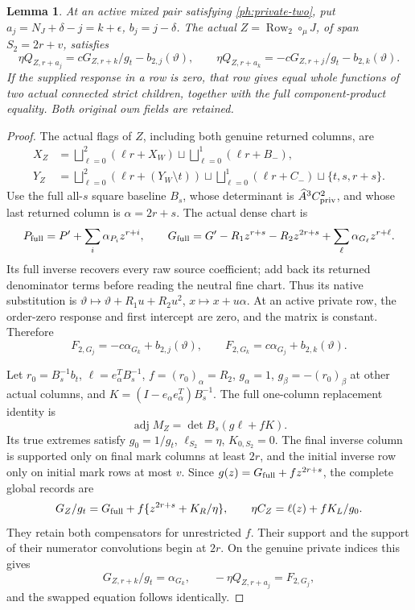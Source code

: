 \documentclass[11pt,a4paper]{amsart}
\numberwithin{equation}{section}
\theoremstyle{plain}
\newtheorem{lemma}[theorem]{Lemma}
\theoremstyle{definition}
\newcommand{\Row}{\operatorname{Row}}
\begin{document}
\begin{lemma}\label{ph:two-copy-equation}
At an active mixed pair satisfying \eqref{ph:private-two}, put
\(a_j=N_J+\delta-j=k+\epsilon\), \(b_j=j-\delta\).
The actual \(Z=\Row_2\circ_\mu J\), of span \(S_2=2r+v\), satisfies
\[
 \eta Q_{Z,r+a_j}
       =cG_{Z,r+k}/g_t-b_{2,j}(\vartheta),
 \qquad
 \eta Q_{Z,r+a_k}
       =-cG_{Z,r+j}/g_t-b_{2,k}(\vartheta).
\]
If the supplied response in a row is zero, that row gives equal whole
functions of two actual connected strict children, together with the
full component-product equality.  Both original own fields are retained.
\end{lemma}
\begin{proof}
The actual flags of \(Z\), including both genuine returned columns, are
\[
 \begin{aligned}
 X_Z&=\bigsqcup_{\ell=0}^{2}(\ell r+X_W)
                      \sqcup\bigsqcup_{\ell=0}^{1}(\ell r+B_-),\\
 Y_Z&=\bigsqcup_{\ell=0}^{2}(\ell r+(Y_W\setminus t))
             \sqcup\bigsqcup_{\ell=0}^{1}(\ell r+C_-)
                         \sqcup\{t,s,r+s\}.
 \end{aligned}
\]
Use the full all-\(s\) square baseline \(B_s\), whose determinant is
\(\widehat A^3C_{\rm priv}^2\), and whose last returned column is
\(\alpha=2r+s\).
The actual dense chart is
\[
 P_{\rm full}=P'+\sum_i\alpha_{P_i}z^{r+i},\qquad
 G_{\rm full}=G'-R_1z^{r+s}-R_2z^{2r+s}
                           +\sum_\ell\alpha_{G_\ell}z^{r+\ell}.
\]
Its full inverse recovers every raw source coefficient; add back its
returned denominator terms before reading the neutral fine chart.
Thus its native substitution is \(\vartheta\mapsto \vartheta+R_1u+R_2u^2\),
\(x\mapsto x+u\alpha\).
At an active private row, the order-zero response and first intercept
are zero, and the matrix is constant.  Therefore
\[
 F_{2,G_j}=-c\alpha_{G_k}+b_{2,j}(\vartheta),\qquad
 F_{2,G_k}=c\alpha_{G_j}+b_{2,k}(\vartheta).
\]

Let \(r_0=B_s^{-1}b_t\), \(\ell=e_\alpha^TB_s^{-1}\),
\(f=(r_0)_\alpha=R_2\),
\(g_\alpha=1\), \(g_\beta=-(r_0)_\beta\) at other actual columns,
and \(K=(I-e_\alpha e_\alpha^T)B_s^{-1}\).
The full one-column replacement identity is
\[
 \operatorname{adj}M_Z=\det B_s(g\ell+fK).
\]
Its true extremes satisfy \(g_0=1/g_t\), \(\ell_{S_2}=\eta\),
\(K_{0,S_2}=0\).
The final inverse column is supported only on final mark columns
at least \(2r\), and the initial inverse row only on initial mark
rows at most \(v\).  Since
\(g(z)=G_{\rm full}+fz^{2r+s}\), the complete global records are
\[
 G_Z/g_t=G_{\rm full}+f\{z^{2r+s}+K_R/\eta\},\qquad
 \eta C_Z=\ell(z)+fK_L/g_0.
\]
They retain both compensators for unrestricted \(f\).
Their support and the support of their numerator convolutions begin
at \(2r\).  On the genuine private indices this gives
\[
 G_{Z,r+k}/g_t=\alpha_{G_k},\qquad
 -\eta Q_{Z,r+a_j}=F_{2,G_j},
\]
and the swapped equation follows identically.


\end{proof}
\end{document}
